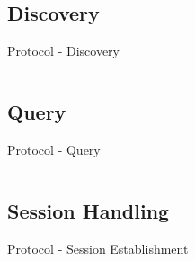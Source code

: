 \documentclass[a4paper]{beamer}
\begin{document}
\subsection{Discovery}

\begin{frame}{Protocol - Discovery}
    \begin{columns}[t]
        \begin{column}{0.45\textwidth}
            
        \end{column}
        \begin{column}{0.45\textwidth}
            
        \end{column}
    \end{columns}
\end{frame}

\subsection{Query}

\begin{frame}{Protocol - Query}
    \begin{columns}[t]
        \begin{column}{0.45\textwidth}
        \end{column}
        \begin{column}{0.45\textwidth}
            
        \end{column}
    \end{columns}
\end{frame}

\subsection{Session Handling}

\begin{frame}{Protocol - Session Establishment}
    \begin{columns}[t]
        \begin{column}{0.45\textwidth}
            
        \end{column}
        \begin{column}{0.45\textwidth}
            
        \end{column}
    \end{columns}
\end{frame}
\end{document}

